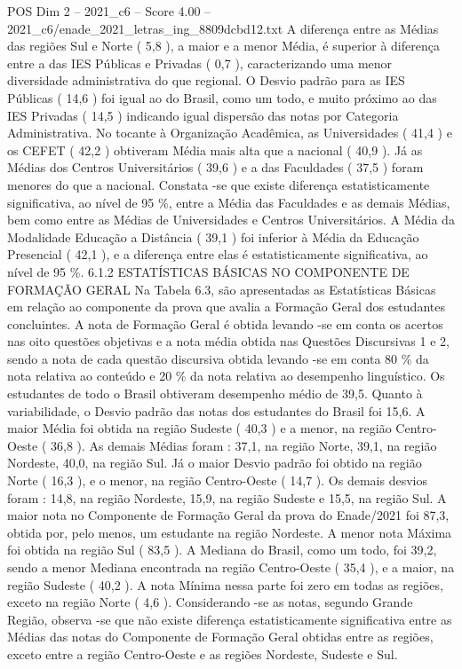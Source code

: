 \begin{textsample}{POS Dim 2 – 2021\_c6 – Score 4.00 – 2021\_c6/enade\_2021\_letras\_ing\_8809dcbd12.txt}
A diferença entre as Médias das regiões Sul e Norte ( 5,8 ), a maior e a menor Média, é superior à diferença entre a das IES Públicas e Privadas ( 0,7 ), caracterizando uma menor diversidade administrativa do que regional.
O Desvio padrão para as IES Públicas ( 14,6 ) foi igual ao do Brasil, como um todo, e muito próximo ao das IES Privadas ( 14,5 ) indicando igual dispersão das notas por Categoria Administrativa.
No tocante à Organização Acadêmica, as Universidades ( 41,4 ) e os CEFET ( 42,2 ) obtiveram Média mais alta que a nacional ( 40,9 ).
Já as Médias dos Centros Universitários ( 39,6 ) e a das Faculdades ( 37,5 ) foram menores do que a nacional.
Constata -se que existe diferença estatisticamente significativa, ao nível de 95 \%, entre a Média das Faculdades e as demais Médias, bem como entre as Médias de Universidades e Centros Universitários.
A Média da Modalidade Educação a Distância ( 39,1 ) foi inferior à Média da Educação Presencial ( 42,1 ), e a diferença entre elas é estatisticamente significativa, ao nível de 95 \%. 6.1.2 ESTATÍSTICAS BÁSICAS NO COMPONENTE DE FORMAÇÃO GERAL Na Tabela 6.3, são apresentadas as Estatísticas Básicas em relação ao componente da prova que avalia a Formação Geral dos estudantes concluintes.
A nota de Formação Geral é obtida levando -se em conta os acertos nas oito questões objetivas e a nota média obtida nas Questões Discursivas 1 e 2, sendo a nota de cada questão discursiva obtida levando -se em conta 80 \% da nota relativa ao conteúdo e 20 \% da nota relativa ao desempenho linguístico.
Os estudantes de todo o Brasil obtiveram desempenho médio de 39,5.
Quanto à variabilidade, o Desvio padrão das notas dos estudantes do Brasil foi 15,6.
A maior Média foi obtida na região Sudeste ( 40,3 ) e a menor, na região Centro-Oeste ( 36,8 ).
As demais Médias foram : 37,1, na região Norte, 39,1, na região Nordeste, 40,0, na região Sul.
Já o maior Desvio padrão foi obtido na região Norte ( 16,3 ), e o menor, na região Centro-Oeste ( 14,7 ).
Os demais desvios foram : 14,8, na região Nordeste, 15,9, na região Sudeste e 15,5, na região Sul.
A maior nota no Componente de Formação Geral da prova do Enade/2021 foi 87,3, obtida por, pelo menos, um estudante na região Nordeste.
A menor nota Máxima foi obtida na região Sul ( 83,5 ).
A Mediana do Brasil, como um todo, foi 39,2, sendo a menor Mediana encontrada na região Centro-Oeste ( 35,4 ), e a maior, na região Sudeste ( 40,2 ).
A nota Mínima nessa parte foi zero em todas as regiões, exceto na região Norte ( 4,6 ).
Considerando -se as notas, segundo Grande Região, observa -se que não existe diferença estatisticamente significativa entre as Médias das notas do Componente de Formação Geral obtidas entre as regiões, exceto entre a região Centro-Oeste e as regiões Nordeste, Sudeste e Sul.

\end{textsample}
